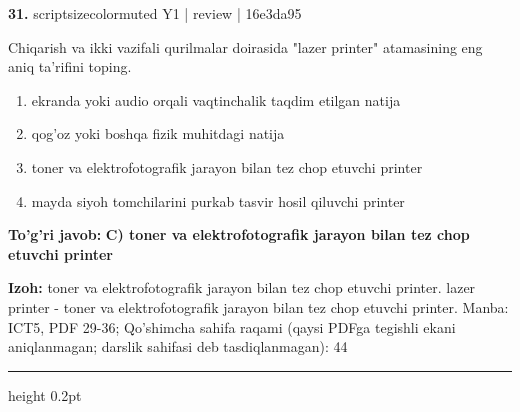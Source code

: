 \documentclass[10pt,a4paper]{article}
\begin{document}
{\bfseries\sffamily\color{ink} 31.} {scriptsizecolor{muted} Y1 | review | 16e3da95}
\par
Chiqarish va ikki vazifali qurilmalar doirasida "lazer printer" atamasining eng aniq ta'rifini toping.
\begin{enumerate}[label=\Alph*),leftmargin=9mm]
\item ekranda yoki audio orqali vaqtinchalik taqdim etilgan natija
\item qog'oz yoki boshqa fizik muhitdagi natija
\item toner va elektrofotografik jarayon bilan tez chop etuvchi printer
\item mayda siyoh tomchilarini purkab tasvir hosil qiluvchi printer
\end{enumerate}
\begin{tcolorbox}[enhanced,breakable,colback=teal!4,colframe=teal!60!black,boxrule=0.45pt,arc=1.2mm,left=2.7mm,right=2.7mm,top=1.8mm,bottom=1.8mm,before skip=2mm,after skip=2mm]
{\bfseries\sffamily\color{teal}To'g'ri javob:} \textbf{C) toner va elektrofotografik jarayon bilan tez chop etuvchi printer}
\par\smallskip
{\bfseries Izoh:} toner va elektrofotografik jarayon bilan tez chop etuvchi printer. lazer printer - toner va elektrofotografik jarayon bilan tez chop etuvchi printer. Manba: ICT5, PDF 29-36; Qo'shimcha sahifa raqami (qaysi PDFga tegishli ekani aniqlanmagan; darslik sahifasi deb tasdiqlanmagan): 44
\end{tcolorbox}
\vspace{2mm}\hrule height 0.2pt\vspace{3mm}
\end{document}
